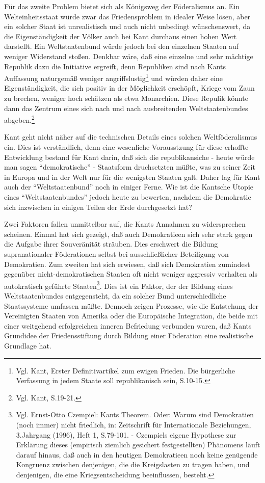 \documentclass[a4paper,12pt]{article}
\begin{document}
Für das zweite Problem bietet sich als Königsweg der Föderalismus an. Ein
Welteinheitsstaat würde zwar das Friedensproblem in idealer Weise lösen, aber
ein solcher Staat ist unrealistisch und auch nicht unbedingt wünschenswert, da
die Eigenständigkeit der Völker auch bei Kant durchaus einen hohen Wert
darstellt. Ein Weltstaatenbund würde jedoch bei den einzelnen Staaten auf
weniger Widerstand stoßen. Denkbar wäre, daß eine einzelne und sehr mächtige
Republik dazu die Initiative ergreift, denn Republiken sind nach Kants
Auffassung naturgemäß weniger angriffslustig\footnote{Vgl. Kant\cite{kant},
  Erster Definitivartikel zum ewigen Frieden. Die bürgerliche Verfassung in
  jedem Staate soll republikanisch sein, S.10-15.} und würden daher eine
Eigenständigkeit, die sich positiv in der Möglichkeit erschöpft, Kriege vom
Zaun zu brechen, weniger hoch schätzen als etwa Monarchien. Diese Repulik
könnte dann das Zentrum eines sich nach und nach ausbreitenden
Weltstaatenbundes abgeben.\footnote{Vgl. Kant\cite{kant}, S.19-21.}

Kant geht nicht näher auf die technischen Details eines solchen
Weltföderalismus ein. Dies ist verständlich, denn eine wesenliche Vorausstzung
für diese erhoffte Entwicklung bestand für Kant darin, daß sich die
republikansiche - heute würde man sagen "`demokratische"' - Staatsform
druchsetzten müßte, was zu seiner Zeit in Europa und in der Welt nur für die
wenigsten Staaten galt. Daher lag für Kant auch der "`Weltstaatenbund"' noch
in einiger Ferne. Wie ist die Kantsche Utopie eines "`Weltstaatenbundes"'
jedoch heute zu bewerten, nachdem die Demokratie sich inzwischen in einigen
Teilen der Erde durchgesetzt hat?

Zwei Faktoren fallen unmittelbar auf, die Kants Annahmen zu widersprechen
scheinen. Einmal hat sich gezeigt, daß auch Demokratieen sich sehr stark gegen
die Aufgabe ihrer Souveränität sträuben. Dies erschwert die Bildung
supranationaler Föderationen selbst bei ausschließlicher Beteiligung von
Demokratien. Zum zweiten hat sich erwiesen, daß sich Demokratien zumindest
gegenüber nicht-demokratischen Staaten oft nicht weniger aggressiv verhalten
als autokratisch geführte Staaten\footnote{Vgl. Ernst-Otto
  Czempiel\cite{czempiel}: Kants Theorem. Oder: Warum sind Demokratien (noch
  immer) nicht friedlich, in: Zeitschrift für Internationale Beziehungen,
  3.Jahrgang (1996), Heft 1, S.79-101. - Czempiels eigene Hypothese zur
  Erklärung dieses (empirisch ziemlich gesichert festgestellten) Phänomens
  läuft darauf hinaus, daß auch in den heutigen Demokratieen noch keine
  genügende Kongruenz zwischen denjenigen, die die Kreigslasten zu tragen
  haben, und denjenigen, die eine Kriegsentscheidung beeinflussen, besteht.}.
Dies ist ein Faktor, der der Bildung eines Weltstaatenbundes entgegensteht, da
ein solcher Bund unterschiedliche Staatssysteme umfassen müßte. Dennoch zeigen
Prozesse, wie die Entstehung der Vereinigten Staaten von Amerika oder die
Europäische Integration, die beide mit einer weitgehend erfolgreichen inneren
Befriedung verbunden waren, daß Kants Grundidee der Friedensstiftung durch
Bildung einer Föderation eine realistische Grundlage hat.
\end{document}
